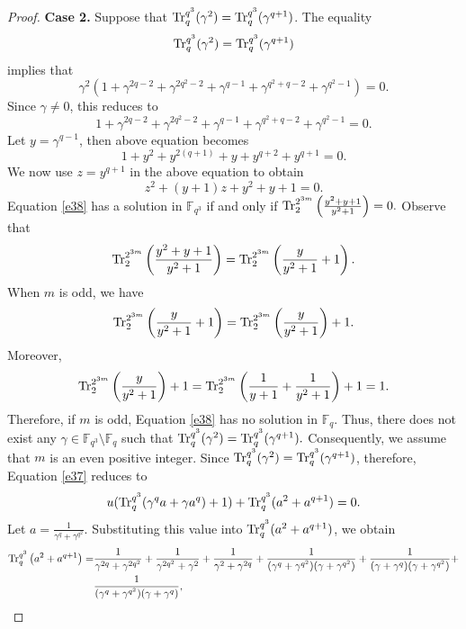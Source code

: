 \documentclass[11pt]{amsart}
\theoremstyle{plain}
\numberwithin{equation}{section}
\theoremstyle{definition}
\newcommand{\F}{\mathbb F}
\def\Tr{{\rm Tr}}
\begin{document}
\begin{proof}
\textbf{Case 2.} Suppose that $\Tr_{q}^{q^3}(\gamma^2)=\Tr_{q}^{q^3}(\gamma^{q+1})$.  The equality  $$\Tr_{q}^{q^3}(\gamma^2)=\Tr_{q}^{q^3}(\gamma^{q+1})$$ implies that 
\begin{equation*}
    \gamma^2(1+\gamma^{2q-2}+\gamma^{2q^2-2}+\gamma^{q-1}+\gamma^{q^2+q-2}+\gamma^{q^2-1})=0.
\end{equation*}
Since $\gamma \neq 0$, this reduces to 
$$1+\gamma^{2q-2}+\gamma^{2q^2-2}+\gamma^{q-1}+\gamma^{q^2+q-2}+\gamma^{q^2-1}=0.$$
 Let $y=\gamma^{q-1}$, then above equation becomes 
 \begin{equation*}
     1+y^2+y^{2(q+1)}+y+y^{q+2}+y^{q+1}=0.
 \end{equation*}
 We now use $z=y^{q+1}$ in the above equation to obtain
 \begin{equation}\label{e38}
     z^2+(y+1)z+y^2+y+1=0.
 \end{equation}
Equation \eqref{e38} has a solution in $\F_{q^3}$ if and only if $\Tr_{2}^{2^{3m}}\left(\frac{y^2+y+1}{y^2+1}\right)=0.$ Observe that 
$$\Tr_{2}^{2^{3m}}\left(\frac{y^2+y+1}{y^2+1}\right)=\Tr_{2}^{2^{3m}}\left(\frac{y}{y^2+1}+1\right).$$
When $m$ is odd, we have
$$\Tr_{2}^{2^{3m}}\left(\frac{y}{y^2+1}+1\right)=\Tr_{2}^{2^{3m}}\left(\frac{y}{y^2+1}\right)+1.$$
Moreover, $$\Tr_{2}^{2^{3m}}\left(\frac{y}{y^2+1}\right)+1=\Tr_{2}^{2^{3m}}\left(\frac{1}{y+1}+\frac{1}{y^2+1}\right)+1=1.$$
Therefore, if $m$ is odd, Equation \eqref{e38} has no solution in $\F_q$. Thus, there does not exist any $\gamma \in \F_{q^3} \setminus \F_q$ such that $\Tr_{q}^{q^3}(\gamma^2)=\Tr_{q}^{q^3}(\gamma^{q+1}).$ Consequently, we assume that $m$ is an even positive integer. Since $\Tr_{q}^{q^3}(\gamma^2)=\Tr_{q}^{q^3}(\gamma^{q+1})$, therefore, Equation \eqref{e37} reduces to
\begin{equation}\label{e39}
    u(\Tr_{q}^{q^3}(\gamma^qa+\gamma a^q)+1)+\Tr_{q}^{q^3}(a^2+a^{q+1})=0.
\end{equation}
Let $a=\frac{1}{\gamma^q+\gamma^{q^2}}.$
Substituting this value into $\Tr_{q}^{q^3}(a^2+a^{q+1})$, we obtain 
\begin{equation*}
\begin{split}
\Tr_{q}^{q^3}\left(a^2+a^{q+1}\right)=&\frac{1}{\gamma^{2q}+\gamma^{2q^2}}+\frac{1}{\gamma^{2q^2}+\gamma^{2}}+\frac{1}{\gamma^{2}+\gamma^{2q}}+\frac{1}{(\gamma^{q}+\gamma^{q^2})(\gamma+\gamma^{q^2})}+\frac{1}{(\gamma+\gamma^{q})(\gamma+\gamma^{q^2})}+\\&\frac{1}{(\gamma^{q}+\gamma^{q^2})(\gamma+\gamma^{q})},
\end{split}

\end{equation*}
\end{proof}
\end{document}
